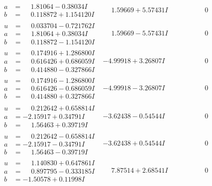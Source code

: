 \documentclass[1p]{elsarticle_modified}
\theoremstyle{definition}
\begin{document}
$$\begin{array}{c|c|c}
\begin{aligned}
a &= \phantom{-}1.81064 - 0.38034 I \\
b &= \phantom{-}0.118872 + 1.154120 I\end{aligned}
 & \phantom{-}1.59669 + 5.57431 I & \phantom{-0.000000 } 0 \\ \hline\begin{aligned}
u &= \phantom{-}0.033704 - 0.721762 I \\
a &= \phantom{-}1.81064 + 0.38034 I \\
b &= \phantom{-}0.118872 - 1.154120 I\end{aligned}
 & \phantom{-}1.59669 - 5.57431 I & \phantom{-0.000000 } 0 \\ \hline\begin{aligned}
u &= \phantom{-}0.174916 + 1.286800 I \\
a &= \phantom{-}0.616426 + 0.686059 I \\
b &= \phantom{-}0.414880 - 0.327866 I\end{aligned}
 & -4.99918 + 3.26807 I & \phantom{-0.000000 } 0 \\ \hline\begin{aligned}
u &= \phantom{-}0.174916 - 1.286800 I \\
a &= \phantom{-}0.616426 - 0.686059 I \\
b &= \phantom{-}0.414880 + 0.327866 I\end{aligned}
 & -4.99918 - 3.26807 I & \phantom{-0.000000 } 0 \\ \hline\begin{aligned}
u &= \phantom{-}0.212642 + 0.658814 I \\
a &= -2.15917 + 0.34791 I \\
b &= \phantom{-}1.56463 + 0.39719 I\end{aligned}
 & -3.62438 - 0.54544 I & \phantom{-0.000000 } 0 \\ \hline\begin{aligned}
u &= \phantom{-}0.212642 - 0.658814 I \\
a &= -2.15917 - 0.34791 I \\
b &= \phantom{-}1.56463 - 0.39719 I\end{aligned}
 & -3.62438 + 0.54544 I & \phantom{-0.000000 } 0 \\ \hline\begin{aligned}
u &= \phantom{-}1.140830 + 0.647861 I \\
a &= \phantom{-}0.897795 - 0.333185 I \\
b &= -1.50578 + 0.11998 I\end{aligned}
 & \phantom{-}7.87514 + 2.68541 I & \phantom{-0.000000 } 0 \\ \hline\begin{aligned}

\end{aligned}
\end{array}$$
\end{document}
